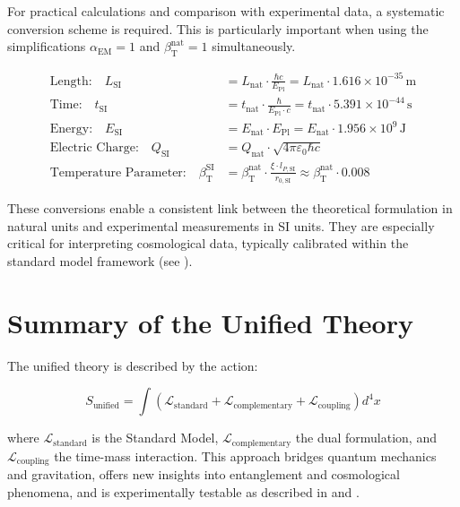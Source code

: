 \documentclass[12pt,a4paper]{article}
\newcommand{\alphaEM}{\alpha_{\text{EM}}}
\newcommand{\betaT}{\beta_{\text{T}}}
\begin{document}
	For practical calculations and comparison with experimental data, a systematic conversion scheme is required. This is particularly important when using the simplifications \(\alphaEM = 1\) and \(\betaT^{\text{nat}} = 1\) simultaneously.
	
	\begin{tcolorbox}[colback=blue!5!white,colframe=blue!75!black,title=Conversion Scheme Between Unit Systems]
		\begin{align}
			\text{Length:} \quad L_{\text{SI}} &= L_{\text{nat}} \cdot \frac{\hbar c}{E_{\text{Pl}}} = L_{\text{nat}} \cdot 1.616 \times 10^{-35} \, \text{m} \\
			\text{Time:} \quad t_{\text{SI}} &= t_{\text{nat}} \cdot \frac{\hbar}{E_{\text{Pl}} \cdot c} = t_{\text{nat}} \cdot 5.391 \times 10^{-44} \, \text{s} \\
			\text{Energy:} \quad E_{\text{SI}} &= E_{\text{nat}} \cdot E_{\text{Pl}} = E_{\text{nat}} \cdot 1.956 \times 10^9 \, \text{J} \\
			\text{Electric Charge:} \quad Q_{\text{SI}} &= Q_{\text{nat}} \cdot \sqrt{4\pi\varepsilon_0 \hbar c} \\
			\text{Temperature Parameter:} \quad \betaT^{\text{SI}} &= \betaT^{\text{nat}} \cdot \frac{\xi \cdot l_{P,\text{SI}}}{r_{0,\text{SI}}} \approx \betaT^{\text{nat}} \cdot 0.008
		\end{align}
	\end{tcolorbox}
	
	These conversions enable a consistent link between the theoretical formulation in natural units and experimental measurements in SI units. They are especially critical for interpreting cosmological data, typically calibrated within the standard model framework (see \cite{pascher_temp_2025}).
	
	\section{Summary of the Unified Theory}
	\label{sec:summary}
	
	The unified theory is described by the action:
	
	\begin{equation}
		S_\text{unified} = \int \left( \mathcal{L}_\text{standard} + \mathcal{L}_\text{complementary} + \mathcal{L}_\text{coupling} \right) d^4x
	\end{equation}
	
	where \(\mathcal{L}_\text{standard}\) is the Standard Model, \(\mathcal{L}_\text{complementary}\) the dual formulation, and \(\mathcal{L}_\text{coupling}\) the time-mass interaction. This approach bridges quantum mechanics and gravitation, offers new insights into entanglement and cosmological phenomena, and is experimentally testable as described in \cite{pascher_lagrange_2025} and \cite{pascher_emergente_gravitation_2025}.
	
\end{document}
